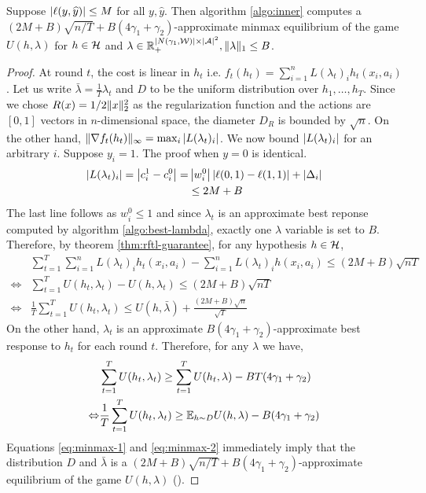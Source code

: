 \begin{lemma}\label{lem:approx-minmax}
Suppose $\left|\ell(y,\widehat{y})\right| \le M$ for all $y,\hat{y}$. Then algorithm \ref{algo:inner} computes a $(2M + B)\sqrt{n/T} + B(4\gamma_1 + \gamma_2)$-approximate minmax equilibrium of the game $U(h,\lambda)$ for $h \in \mathcal{H}$ and $\lambda \in \mathbb{R}^{\left|N(\gamma_1,\mathcal{W})\right|\times \left|\mathcal{A}\right|^2}_+, \lVert \lambda \rVert_1 \le B$. 
\end{lemma}
\begin{proof}
At round $t$, the cost is linear in $h_t$ i.e. $f_t(h_t) = \sum_{i=1}^n L(\lambda_t)_i h_t(x_i,a_i)$. Let us write $\bar{\lambda} = \frac{1}{T} \lambda_t$ and $D$ to be the uniform distribution over $h_1,\ldots,h_T$. Since we chose $R(x) = 1/2 \lVert x \rVert_2^2$ as the regularization function and the actions are $[0,1]$ vectors in $n$-dimensional space, the diameter $D_R$ is bounded by $\sqrt{n}$. On the other hand, $\lVert \nabla f_t(h_t) \rVert_{\infty} = \max_i \left|L(\lambda_t)_i\right| $. We now bound $\left|L(\lambda_t)_i\right|$ for an arbitrary $i$. Suppose $y_i=1$. The proof when $y=0$ is identical.
\begin{align*}
\left|L(\lambda_t)_i\right| = \left|c^1_i - c^0_i\right| = &\left|w^0_i\right|\left|\ell(0,1) - \ell(1,1)\right| + \left|\Delta_i\right| \\
&\le 2M + B
\end{align*}
The last line follows as $w^0_i \le 1$ and since $\lambda_t$ is an approximate best reponse computed by algorithm \ref{algo:best-lambda}, exactly one $\lambda$ variable is set to $B$.
Therefore, by theorem \ref{thm:rftl-guarantee}, for any hypothesis $h \in \mathcal{H}$,
\begin{align}
&\sum_{t=1}^T \sum_{i=1}^n L(\lambda_t)_i h_t(x_i,a_i) - \sum_{i=1}^n L(\lambda_t)_i h(x_i,a_i) \le (2M + B)\sqrt{nT}\nonumber \\
\Leftrightarrow &\sum_{t=1}^T U(h_t,\lambda_t) - U(h,\lambda_t) \le (2M + B)\sqrt{nT}\nonumber \\
\Leftrightarrow &\frac{1}{T} \sum_{t=1}^T U(h_t,\lambda_t) \le U(h,\bar{\lambda}) + \frac{(2M + B)\sqrt{n}}{\sqrt{T}} \label{eq:minmax-1}
\end{align}
On the other hand, $\lambda_t$ is an approximate $B(4\gamma_1 + \gamma_2)$-approximate best response to $h_t$ for each round $t$. Therefore, for any $\lambda$ we have,
\begin{align}
&\sum_{t=1}^T U(h_t,\lambda_t) \ge \sum_{t=1}^T U(h_t,\lambda) - BT(4\gamma_1 + \gamma_2)\nonumber \\
\Leftrightarrow &\frac{1}{T} \sum_{t=1}^T U(h_t,\lambda_t) \ge \mathbb{E}_{h \sim D} U(h,\lambda) - B(4\gamma_1 + \gamma_2) \label{eq:minmax-2}
\end{align}
Equations \ref{eq:minmax-1} and \ref{eq:minmax-2} immediately imply that the distribution $D$ and $\bar{\lambda}$ is a $(2M + B)\sqrt{n/T} + B(4\gamma_1 + \gamma_2)$-approximate equilibrium of the game $U(h,\lambda)$ (\cite{FS96}).
\end{proof}

